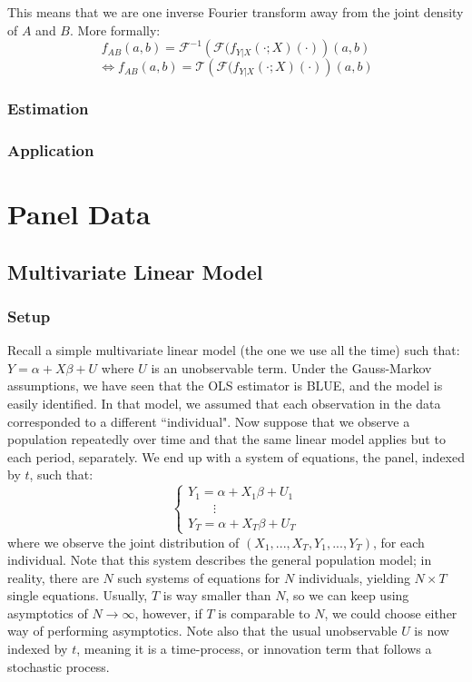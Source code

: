 \documentclass[12pt]{report}
\begin{document}
This means that we are one inverse Fourier transform away from the joint density of $A$ and $B$. More formally: $$f_{AB}(a,b) = \mathcal{F}^{-1}\left(\mathcal{F}(f_{Y\vert X}(\cdot; X)(\cdot)\right)(a, b) $$
$$\Leftrightarrow f_{AB}(a,b) = \mathcal{T}\left(\mathcal{F}(f_{Y\vert X}(\cdot; X)(\cdot)\right)(a, b) $$

\subsection{Estimation}



\subsection{Application}



\chapter{Panel Data}

\section{Multivariate Linear Model}

\subsection{Setup}

Recall a simple multivariate linear model (the one we use all the time) such that: $Y = \alpha + X\beta + U$ where $U$ is an unobservable term. Under the Gauss-Markov assumptions, we have seen that the OLS estimator is BLUE, and the model is easily identified. In that model, we assumed that each observation in the data corresponded to a different ``individual". Now suppose that we observe a population repeatedly over time and that the same linear model applies but to each period, separately. We end up with a system of equations, the panel, indexed by $t$, such that: $$\begin{cases} 
Y_1 = \alpha + X_1\beta + U_1 \\
\quad \quad \vdots \\
Y_T = \alpha + X_T\beta + U_T
\end{cases} $$ where we observe the joint distribution of $(X_1, ..., X_T, Y_1, ..., Y_T)$, for each individual. Note that this system describes the general population model; in reality, there are $N$ such systems of equations for $N$ individuals, yielding $N\times T$ single equations. Usually, $T$ is way smaller than $N$, so we can keep using asymptotics of $N\to\infty$, however, if $T$ is comparable to $N$, we could choose either way of performing asymptotics. Note also that the usual unobservable $U$ is now indexed by $t$, meaning it is a time-process, or innovation term that follows a stochastic process.
\end{document}

